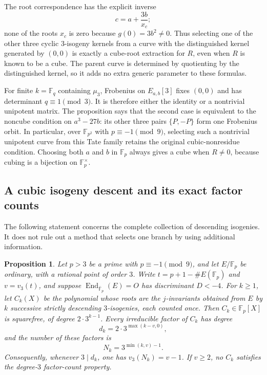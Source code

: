 \documentclass[11pt]{article}
\newtheorem{proposition}[theorem]{Proposition}
\theoremstyle{definition}
\theoremstyle{remark}
\begin{document}
The root correspondence has the explicit inverse
\[
 c=a+\frac{3b}{x_c};
\]
none of the roots $x_c$ is zero because $g(0)=3b^2\ne0$.
Thus selecting one of the other three cyclic $3$-isogeny kernels
from a curve with the distinguished kernel generated by $(0,0)$
is exactly a cube-root extraction for $R$, even when $R$ is known
to be a cube.  The parent curve is determined by quotienting by
the distinguished kernel, so it adds no extra generic parameter
to these formulas.

For finite $k=\mathbb F_q$ containing $\mu_3$, Frobenius on
$E_{a,b}[3]$ fixes $(0,0)$ and has determinant $q\equiv1\pmod3$.
It is therefore either the identity or a nontrivial unipotent
matrix.  The proposition says that the second case is equivalent
to the noncube condition on $a^3-27b$: its other three pairs
$\{P,-P\}$ form one Frobenius orbit.  In particular, over
$\mathbb F_{p^2}$ with $p\equiv-1\pmod9$, selecting such a
nontrivial unipotent curve from this Tate family retains the
original cubic-nonresidue condition.  Choosing both $a$ and $b$
in $\mathbb F_p$ always gives a cube when $R\ne0$, because cubing
is a bijection on $\mathbb F_p^\times$.

\subsection{A cubic isogeny descent and its exact factor counts}

The following statement concerns the complete collection of descending
isogenies.  It does not rule out a method that selects one branch by using
additional information.

\begin{proposition}\label{prop:cubic-volcano-count}
Let $p>3$ be a prime with $p\equiv-1\pmod9$, and let
$E/\mathbb F_p$ be ordinary, with a rational point of order $3$.
Write $t=p+1-\#E(\mathbb F_p)$ and $v=v_3(t)$, and suppose
$\operatorname{End}_{\overline{\mathbb F}_p}(E)=O$ has discriminant
$D<-4$.  For $k\ge1$, let $C_k(X)$ be the polynomial whose roots
are the $j$-invariants obtained from $E$ by $k$ successive strictly
descending $3$-isogenies, each counted once.  Then
$C_k\in\mathbb F_p[X]$ is squarefree, of degree $2\cdot3^{k-1}$.
Every irreducible factor of $C_k$ has degree
\[
 d_k=2\cdot3^{\max(k-v,0)},
\]
and the number of these factors is
\[
 N_k=3^{\min(k,v)-1}.
\]
Consequently, whenever $3\mid d_k$, one has
$v_3(N_k)=v-1$.  If $v\ge2$, no $C_k$ satisfies the
degree-$3$ factor-count property.
\end{proposition}
\end{document}
